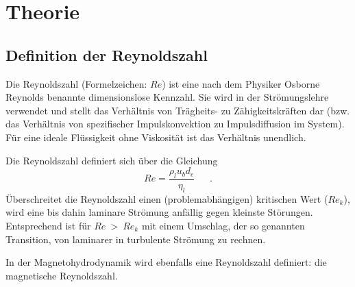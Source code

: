 \chapter{Theorie}
\label{sec:Theorie}
\section{Definition der Reynoldszahl}
\label{sec:DefinitionDerReynoldszahl}
Die Reynoldszahl (Formelzeichen: $Re$) ist eine nach dem Physiker Osborne Reynolds benannte dimensionslose Kennzahl. Sie wird in der Strömungslehre verwendet und stellt das Verhältnis von Trägheits- zu Zähigkeitskräften dar (bzw. das Verhältnis von spezifischer Impulskonvektion zu Impulsdiffusion im System). Für eine ideale Flüssigkeit ohne Viskosität ist das Verhältnis unendlich.\par
Die Reynoldszahl definiert sich über die Gleichung
\begin{equation}
	Re= \frac{\rho_l u_b d_e}{\eta_l} \ \ \ \ \ \ \ \mbox{.}
\end{equation}
Überschreitet die Reynoldszahl einen (problemabhängigen) kritischen Wert ($Re_k$), wird eine bis dahin laminare Strömung anfällig gegen kleinste Störungen. Entsprechend ist für $Re~>~Re_k$ mit einem Umschlag, der so genannten Transition, von laminarer in turbulente Strömung zu rechnen.\par
In der Magnetohydrodynamik wird ebenfalls eine Reynoldszahl definiert: die magnetische Reynoldszahl.
